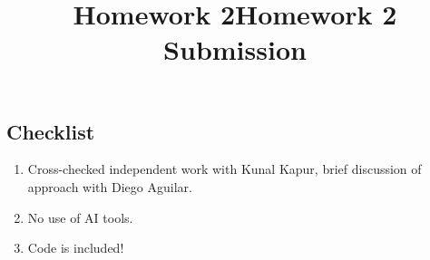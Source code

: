 \documentclass[]{exam}
\title{Homework 2}
\title{Homework 2 Submission}
\begin{document}
\maketitle

\hypertarget{problem-0-homework-checklist}{%
\subsection{Checklist}\label{problem-0-homework-checklist}}

\begin{enumerate}
	\item Cross-checked independent work with Kunal Kapur, brief discussion of approach with Diego Aguilar.
	\item No use of AI tools.
	\item Code is included!
\end{enumerate}
\end{document}
